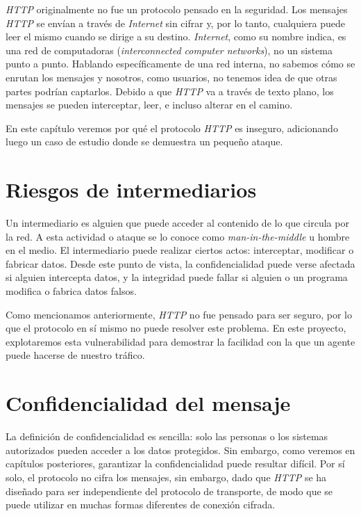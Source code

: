 


\emph{HTTP} originalmente no fue un protocolo pensado en la seguridad. Los mensajes 
\emph{HTTP} se envían a través de \emph{Internet} sin cifrar y, por 
lo tanto, cualquiera puede leer el mismo cuando se dirige a su destino. 
\emph{Internet}, como su nombre indica, es una red de computadoras 
(\emph{interconnected computer networks}), no un sistema 
punto a punto. Hablando específicamente de una red interna, no sabemos cómo 
se enrutan los 
mensajes y nosotros, como usuarios, no tenemos idea de que otras partes 
podrían captarlos. Debido a que \emph{HTTP} va a través de texto plano, 
los mensajes se pueden interceptar, leer, e incluso alterar en el camino.

En este capítulo veremos por qué el protocolo \emph{HTTP} es inseguro, adicionando
luego un 
caso de estudio donde se demuestra un pequeño ataque.

\section{Riesgos de intermediarios}

Un intermediario es alguien que puede acceder al contenido de lo que circula por 
la red. A esta actividad o ataque se lo conoce como \emph{man-in-the-middle} u 
hombre en el medio. 
El intermediario puede realizar ciertos actos: interceptar, modificar o 
fabricar datos. Desde este punto de vista, la confidencialidad puede verse 
afectada si alguien intercepta datos, y la integridad puede fallar si 
alguien o un programa modifica o fabrica datos falsos. 

Como mencionamos anteriormente, \emph{HTTP} no fue pensado para ser seguro, por lo que 
el protocolo en sí mismo no puede resolver este problema.
En este proyecto, explotaremos esta vulnerabilidad para demostrar la facilidad
 con la que un agente puede hacerse de nuestro tráfico.




\section{Confidencialidad del mensaje}
La definición de confidencialidad es sencilla: solo las personas o los 
sistemas autorizados pueden acceder a los datos protegidos.
Sin embargo, como veremos en capítulos posteriores, garantizar la confidencialidad 
puede resultar difícil.
 Por sí solo, el protocolo no cifra los mensajes, 
sin embargo, dado que \emph{HTTP} se ha diseñado para ser independiente del protocolo de 
transporte, de modo que se puede utilizar en muchas formas diferentes de 
conexión cifrada.


